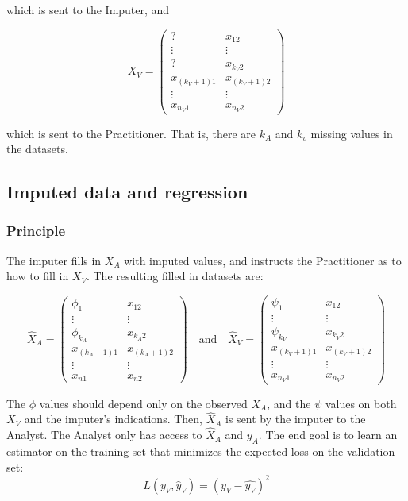 which is sent to the Imputer, and

\begin{equation*}
X_V = 
\begin{pmatrix}
? & x_{12} \\
\vdots & \vdots \\
? & x_{k_V 2} \\
x_{(k_V+1)1} & x_{(k_V+1)2}\\
\vdots & \vdots \\
x_{n_V 1} & x_{n_V 2}
\end{pmatrix}
\end{equation*}

which is sent to the Practitioner. That is, there are $k_A$ and $k_v$ missing values in the datasets.

		\subsection{Imputed data and regression}
			\subsubsection{Principle}
The imputer fills in $X_A$ with imputed values, and instructs the Practitioner as to how to fill in $X_V$. The resulting filled in datasets are:

\begin{equation*}
\hat{X}_A = 
\begin{pmatrix}
\phi_1 & x_{12} \\
\vdots & \vdots \\
\phi_{k_A} & x_{k_A 2} \\
x_{(k_A+1)1} & x_{(k_A+1)2}\\
\vdots & \vdots \\
x_{n 1} & x_{n 2}
\end{pmatrix}
\quad \mathrm{and} \quad
\hat{X}_V = 
\begin{pmatrix}
\psi_1 & x_{12} \\
\vdots & \vdots \\
\psi_{k_V} & x_{k_V 2} \\
x_{(k_V+1)1} & x_{(k_V+1)2}\\
\vdots & \vdots \\
x_{n_V 1} & x_{n_V 2}
\end{pmatrix}
\end{equation*}

The $\phi$ values should depend only on the observed $X_A$, and the $\psi$ values on both $X_V$ and the imputer's indications. Then, $\hat{X}_A$ is sent by the imputer to the Analyst. The Analyst only has access to $\hat{X}_A$ and $y_A$. 
The end goal is to learn an estimator on the training set that minimizes the expected loss on the validation set:
$$
L(y_V, \hat{y}_V) = (y_V - \hat{y_V})^2
$$


